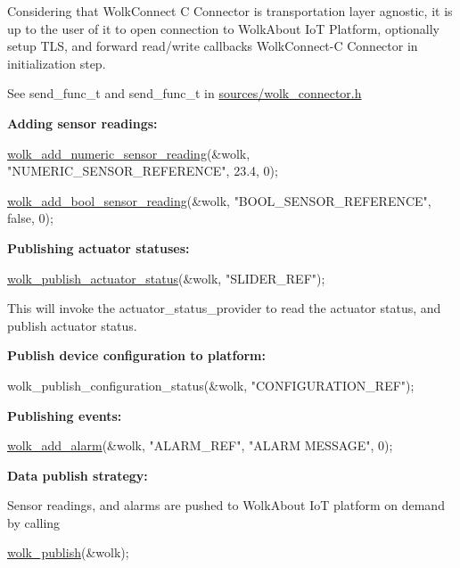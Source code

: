  Considering that Wolk\+Connect C Connector is transportation layer agnostic, it is up to the user of it to open connection to Wolk\+About IoT Platform, optionally setup T\+LS, and forward read/write callbacks Wolk\+Connect-\/C Connector in initialization step.

See {\ttfamily send\+\_\+func\+\_\+t} and {\ttfamily send\+\_\+func\+\_\+t} in {\ttfamily \hyperlink{wolk__connector_8h}{sources/wolk\+\_\+connector.\+h}}

{\bfseries Adding sensor readings\+:} 
\begin{DoxyCode}
\hyperlink{wolk__connector_8h_ab7bcc53c7c06a6cc2b8db5190b1af70f}{wolk\_add\_numeric\_sensor\_reading}(&wolk, \textcolor{stringliteral}{"NUMERIC\_SENSOR\_REFERENCE"}, 23.4, 0);

\hyperlink{wolk__connector_8h_ad1bb3cf88c78d7aa9669c4118e654849}{wolk\_add\_bool\_sensor\_reading}(&wolk, \textcolor{stringliteral}{"BOOL\_SENSOR\_REFERENCE"}, \textcolor{keyword}{false}, 0);
\end{DoxyCode}


{\bfseries Publishing actuator statuses\+:} 
\begin{DoxyCode}
\hyperlink{wolk__connector_8h_aa510c9f8df1d095d4e1aef9b7fdaf600}{wolk\_publish\_actuator\_status}(&wolk, \textcolor{stringliteral}{"SLIDER\_REF"});
\end{DoxyCode}
 This will invoke the {\ttfamily actuator\+\_\+status\+\_\+provider} to read the actuator status, and publish actuator status.

{\bfseries Publish device configuration to platform\+:} 
\begin{DoxyCode}
wolk\_publish\_configuration\_status(&wolk, \textcolor{stringliteral}{"CONFIGURATION\_REF"});
\end{DoxyCode}


{\bfseries Publishing events\+:} 
\begin{DoxyCode}
\hyperlink{wolk__connector_8h_aec965973c23d360dc158d8ef6d037e54}{wolk\_add\_alarm}(&wolk, \textcolor{stringliteral}{"ALARM\_REF"}, \textcolor{stringliteral}{"ALARM MESSAGE"}, 0);
\end{DoxyCode}


{\bfseries Data publish strategy\+:}

Sensor readings, and alarms are pushed to Wolk\+About IoT platform on demand by calling 
\begin{DoxyCode}
\hyperlink{wolk__connector_8h_ac5e7ddb346ea4b9a7cc4511d3728be09}{wolk\_publish}(&wolk);
\end{DoxyCode}


